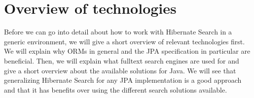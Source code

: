 
\section{Overview of technologies}\label{Overview}
Before we can go into detail about how to work with Hibernate Search in a generic environment, we will give a short overview of relevant technologies first. We will explain why ORMs in general and the JPA specification in particular are beneficial. Then, we will explain what fulltext search engines are used for and give a short overview about the available solutions for Java. We will see that generalizing Hibernate Search for any JPA implementation is a good approach and that it has benefits over using the different search solutions available.

